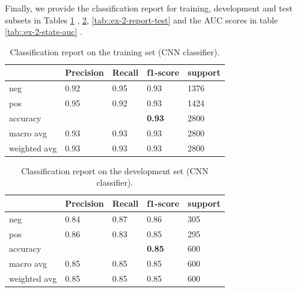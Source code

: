 \documentclass[10pt, a4paper]{article}
\begin{document}
	 
 
 Finally, we provide the classification report for training, development and test subsets in Tables \ref{tab::ex-2-report-train} , \ref{tab::ex-2-report-dev}, \ref{tab::ex-2-report-test} and the AUC scores in table \ref{tab::ex-2-stats-auc} .
	
	\begin{table}
		\begin{tabular}{|l|l|l|l|l|}
			\hline
			\cellcolor{blue!25}\textbf{} & \cellcolor{blue!25}\textbf{Precision} &
			\cellcolor{blue!25}\textbf{Recall}  &
			\cellcolor{blue!25}\textbf{f1-score}  &
			\cellcolor{blue!25}\textbf{support}\\
			\hline
			neg & 0.92 & 0.95 & 0.93 & 1376 \\\hline
			pos & 0.95  & 0.92 & 0.93 & 1424 \\\hline
			accuracy & & & \textbf{0.93} & 2800 \\\hline
			macro avg & 0.93 & 0.93 & 0.93 & 2800 \\\hline
			weighted avg & 0.93 & 0.93 & 0.93 & 2800 \\\hline
			
		\end{tabular}
		\centering
		\caption{Classification report on the training set (CNN classifier).}
		\label{tab::ex-2-report-train}
	\end{table}
	
	\begin{table}
		\begin{tabular}{|l|l|l|l|l|}
			\hline
			\cellcolor{blue!25}\textbf{} & \cellcolor{blue!25}\textbf{Precision} &
			\cellcolor{blue!25}\textbf{Recall}  &
			\cellcolor{blue!25}\textbf{f1-score}  &
			\cellcolor{blue!25}\textbf{support}\\
			\hline
			neg & 0.84 & 0.87 & 0.86 & 305 \\\hline
			pos & 0.86  & 0.83 & 0.85 & 295 \\\hline
			accuracy & & & \textbf{0.85} & 600 \\\hline
			macro avg & 0.85 & 0.85 & 0.85 & 600 \\\hline
			weighted avg & 0.85 & 0.85 & 0.85 & 600 \\\hline
			
		\end{tabular}
		\centering
		\caption{Classification report on the development set (CNN classifier).}
		\label{tab::ex-2-report-dev}
	\end{table}
	
\end{document}
